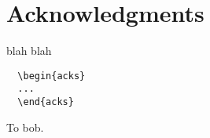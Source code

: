 \section{Acknowledgments}
 blah blah
\begin{verbatim}
  \begin{acks}
  ...
  \end{acks}
\end{verbatim}


\begin{acks}
To bob.
\end{acks}
